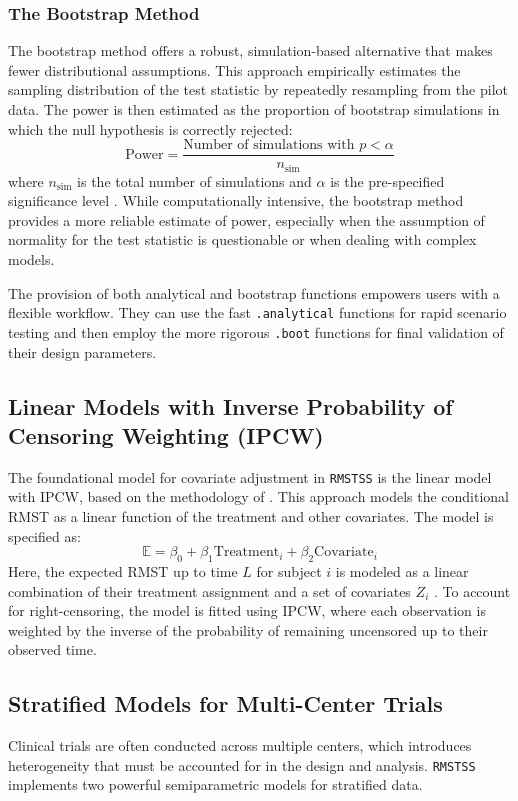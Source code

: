 \documentclass[11pt, a4paper]{article}
\begin{document}
\subsubsection{The Bootstrap Method}
The bootstrap method offers a robust, simulation-based alternative that makes fewer distributional assumptions. This approach empirically estimates the sampling distribution of the test statistic by repeatedly resampling from the pilot data. The power is then estimated as the proportion of bootstrap simulations in which the null hypothesis is correctly rejected:
\begin{equation}
 \text{Power} = \frac{\text{Number of simulations with } p < \alpha}{n_{\text{sim}}}
\end{equation}
where $n_{\text{sim}}$ is the total number of simulations and $\alpha$ is the pre-specified significance level \cite{[1]}. While computationally intensive, the bootstrap method provides a more reliable estimate of power, especially when the assumption of normality for the test statistic is questionable or when dealing with complex models.

The provision of both analytical and bootstrap functions empowers users with a flexible workflow. They can use the fast \texttt{.analytical} functions for rapid scenario testing and then employ the more rigorous \texttt{.boot} functions for final validation of their design parameters.

\subsection{Linear Models with Inverse Probability of Censoring Weighting (IPCW)}
The foundational model for covariate adjustment in \texttt{RMSTSS} is the linear model with IPCW, based on the methodology of \citet{tian2014}. This approach models the conditional RMST as a linear function of the treatment and other covariates. The model is specified as:
\begin{equation}
\mathbb{E} = \beta_0 + \beta_1 \text{Treatment}_i + \beta_2 \text{Covariate}_{i}
\end{equation}
Here, the expected RMST up to time $L$ for subject $i$ is modeled as a linear combination of their treatment assignment and a set of covariates $Z_i$ \cite{[1]}. To account for right-censoring, the model is fitted using IPCW, where each observation is weighted by the inverse of the probability of remaining uncensored up to their observed time.

\subsection{Stratified Models for Multi-Center Trials}
Clinical trials are often conducted across multiple centers, which introduces heterogeneity that must be accounted for in the design and analysis. \texttt{RMSTSS} implements two powerful semiparametric models for stratified data.
\end{document}
